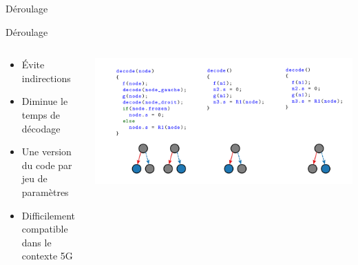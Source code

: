 \begin{frame}[c]{Déroulage}
\end{frame}

\begin{frame}[c]{Déroulage}
\begin{columns}
	\begin{column}{.5\textwidth}
	\begin{itemize}
		\vfill
		\item \'Evite indirections
		\vfill
		\item Diminue le temps de décodage
		\vfill
		\item Une version du code par jeu de paramètres
		\vfill
		\item Difficilement compatible dans le contexte 5G
		\vfill
	\end{itemize}
	\end{column}

	\begin{column}{.5\textwidth}
		\vfill
			\includegraphics[width=\textwidth]{./fig/unrolling-4}
			\vfill
	\end{column}

\end{columns}
\end{frame}


